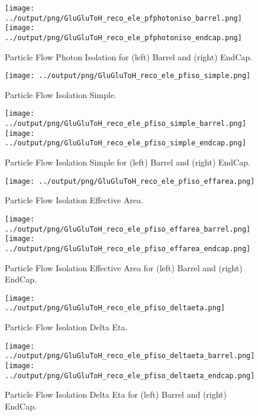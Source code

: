 \documentclass[11pt]{book}
\begin{document}
\begin{figure}[ht]
\centering
\texttt{[image: ../output/png/GluGluToH\_reco\_ele\_pfphotoniso\_barrel.png]}
\texttt{[image: ../output/png/GluGluToH\_reco\_ele\_pfphotoniso\_endcap.png]}
\caption{Particle Flow Photon Isolation for (left) Barrel and (right) EndCap.}
\label{fig:gluglu_reco_ele_pfphotoniso_regions}
\end{figure}

\begin{figure}[ht]
\centering
\texttt{[image: ../output/png/GluGluToH\_reco\_ele\_pfiso\_simple.png]}
\caption{Particle Flow Isolation Simple.}
\label{fig:gluglu_reco_ele_pfiso_simple}
\end{figure}

\begin{figure}[ht]
\centering
\texttt{[image: ../output/png/GluGluToH\_reco\_ele\_pfiso\_simple\_barrel.png]}
\texttt{[image: ../output/png/GluGluToH\_reco\_ele\_pfiso\_simple\_endcap.png]}
\caption{Particle Flow Isolation Simple for (left) Barrel and (right) EndCap.}
\label{fig:gluglu_reco_ele_pfiso_simple_regions}
\end{figure}

\begin{figure}[ht]
\centering
\texttt{[image: ../output/png/GluGluToH\_reco\_ele\_pfiso\_effarea.png]}
\caption{Particle Flow Isolation Effective Area.}
\label{fig:gluglu_reco_ele_pfiso_effarea}
\end{figure}

\begin{figure}[ht]
\centering
\texttt{[image: ../output/png/GluGluToH\_reco\_ele\_pfiso\_effarea\_barrel.png]}
\texttt{[image: ../output/png/GluGluToH\_reco\_ele\_pfiso\_effarea\_endcap.png]}
\caption{Particle Flow Isolation Effective Area for (left) Barrel and (right) EndCap.}
\label{fig:gluglu_reco_ele_pfiso_effarea_regions}
\end{figure}

\begin{figure}[ht]
\centering
\texttt{[image: ../output/png/GluGluToH\_reco\_ele\_pfiso\_deltaeta.png]}
\caption{Particle Flow Isolation Delta Eta.}
\label{fig:gluglu_reco_ele_pfiso_deltaeta}
\end{figure}

\begin{figure}[ht]
\centering
\texttt{[image: ../output/png/GluGluToH\_reco\_ele\_pfiso\_deltaeta\_barrel.png]}
\texttt{[image: ../output/png/GluGluToH\_reco\_ele\_pfiso\_deltaeta\_endcap.png]}
\caption{Particle Flow Isolation Delta Eta for (left) Barrel and (right) EndCap.}
\label{fig:gluglu_reco_ele_pfiso_deltaeta_regions}
\end{figure}
\end{document}
